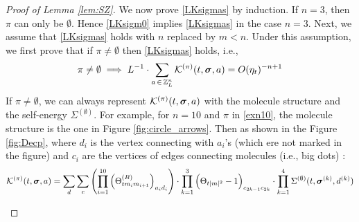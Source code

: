 \documentclass[10pt,reqno]{article}
\theoremstyle{plain} %
\theoremstyle{remark}
\numberwithin{equation}{section}
\begin{document}
\begin{proof}[ Proof of Lemma  \ref{lem:SZ}]
We now prove \eqref{LKsigmas} by  induction. If $n=3$, then $\pi$ can only be $\emptyset$. Hence \eqref{LKsigm0} implies \eqref{LKsigmas} in the case $n=3$. Next, we assume that \eqref{LKsigmas} holds with \( n \) replaced by \( m < n \). Under this assumption, we first prove that if  $\pi\ne \emptyset$ then \eqref{LKsigmas} holds, i.e., 
\begin{align} 
 \pi\ne\emptyset\implies  L^{-1}\cdot \sum_{\textbf{a}\,\in \,\mathbb Z^{n}_L } 
{\cal K}^{(\pi)}(t, \boldsymbol{\sigma}, \textbf{a})=O (\eta_t)^{-n+1}  
\end{align}
If $\pi\ne \emptyset$, we can always represent 
$ 
{\cal K}^{(\pi)}(t, \boldsymbol{\sigma}, \textbf{a})
$ with the molecule structure and the self-energy  $\Sigma^{(\emptyset)}$. For example, for $n=10$ and $\pi$ in \eqref{exn10}, the molecule structure is the one in Figure \ref{fig:circle_arrows}. Then as shown in the Figure \ref{fig:Decp}, where $d_i$ is the vertex connecting with $a_i$'s (which ere not marked  in the figure) and $c_i$ are the vertices of edges connecting molecules (i.e., big dots) :
$$
{\cal K}^{(\pi)}(t, \boldsymbol{\sigma}, \textbf{a})=
\sum_{\textbf{d}}\sum_{\textbf{c}}\left(\prod_{i=1}^{10}\left(\Theta^{(B)}_{tm_im_{i+1}}\right)_{a_id_i}\right)\cdot \prod_{k=1}^3\Big(\Theta_{{t|m|^2}}-1\Big)_{c_{2k-1}c_{2k}}
\cdot
 \prod_{k=1}^4{\Sigma}^{(\emptyset)}(t, \boldsymbol{\sigma}^{(k)}, \textbf{d}^{(k)})
$$
\begin{figure}[ht]
    \centering
\end{figure}
\end{proof}
\end{document}
